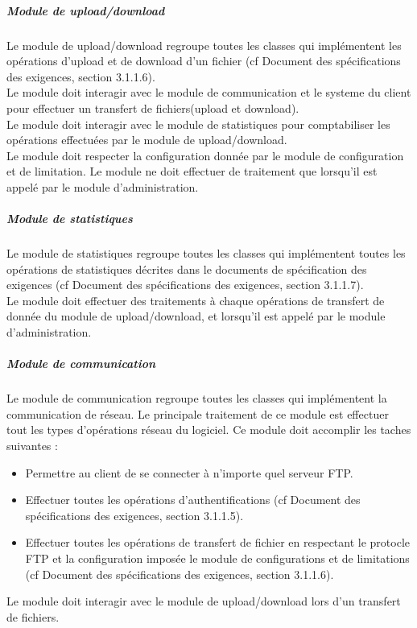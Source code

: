 \documentclass[10pt,a4paper]{report}
\begin{document}
				\subparagraph{Module de upload/download}
				\begin{flushleft}
				Le module de upload/download regroupe toutes les classes qui implémentent les opérations d'upload et de download d'un fichier (cf Document des spécifications des exigences, section 3.1.1.6). \\
				Le module doit interagir avec le module de communication et le systeme du client pour effectuer un transfert de fichiers(upload et download).\\
				Le module doit interagir avec le module de statistiques pour comptabiliser les opérations effectuées par le module de upload/download.\\
				Le module doit respecter la configuration donnée par le module de configuration et de limitation.
				Le module ne doit effectuer de traitement que lorsqu'il est appelé par le module d'administration.
				\end{flushleft}
	
				\subparagraph{Module de statistiques}
				\begin{flushleft}
				Le module de statistiques regroupe toutes les classes qui implémentent toutes les opérations de statistiques décrites dans le documents de  spécification des exigences (cf Document des spécifications des exigences, section 3.1.1.7).\\
				Le module doit effectuer des traitements à chaque opérations de transfert de donnée du module de upload/download, et lorsqu'il est appelé par le module d'administration.
				\end{flushleft}
				
	
				\subparagraph{Module de communication}
				\begin{flushleft}
				Le module de communication regroupe toutes les classes qui implémentent la communication de réseau. Le principale traitement de ce module est effectuer tout les types d'opérations réseau du logiciel. Ce module doit accomplir les taches suivantes :
				\begin{itemize}
					\item Permettre au client de se connecter à n'importe quel serveur FTP.
					\item Effectuer toutes les opérations d'authentifications (cf Document des spécifications des exigences, section 3.1.1.5).
					\item Effectuer toutes les opérations de transfert de fichier en respectant le protocle FTP et la configuration imposée le module de configurations et de limitations (cf Document des spécifications des exigences, section 3.1.1.6).
				\end{itemize}
				
				Le module doit interagir avec le module de upload/download lors d'un transfert de fichiers.\\
				\end{flushleft}
				
\end{document}
